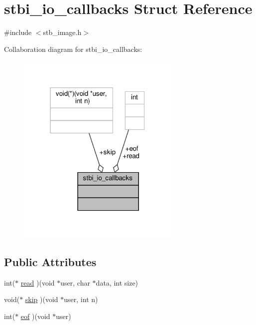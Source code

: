 \hypertarget{structstbi__io__callbacks}{}\section{stbi\+\_\+io\+\_\+callbacks Struct Reference}
\label{structstbi__io__callbacks}


{\ttfamily \#include $<$stb\+\_\+image.\+h$>$}



Collaboration diagram for stbi\+\_\+io\+\_\+callbacks\+:
\nopagebreak
\begin{figure}[H]
\begin{center}
\leavevmode
\includegraphics[width=222pt]{structstbi__io__callbacks__coll__graph}
\end{center}
\end{figure}
\subsection*{Public Attributes}
\begin{DoxyCompactItemize}
\item 
int($\ast$ \hyperlink{structstbi__io__callbacks_a623e46b3a2a019611601409926283a88}{read} )(void $\ast$user, char $\ast$data, int size)
\item 
void($\ast$ \hyperlink{structstbi__io__callbacks_a257aac5480a90a6c4b8fbe86c1b01068}{skip} )(void $\ast$user, int n)
\item 
int($\ast$ \hyperlink{structstbi__io__callbacks_a319639db2f76e715eed7a7a974136832}{eof} )(void $\ast$user)
\end{DoxyCompactItemize}


